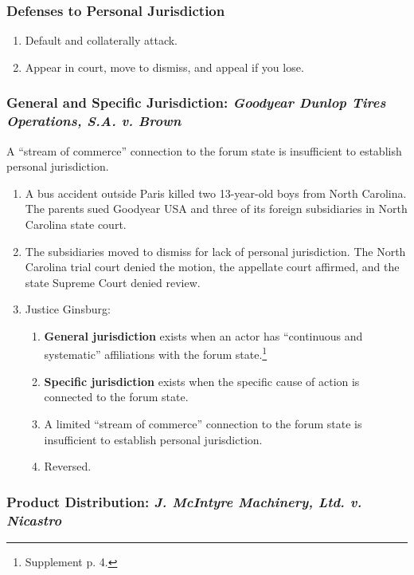 \subsubsection{Defenses to Personal Jurisdiction}

\begin{enumerate}
    \item Default and collaterally attack.
    \item Appear in court, move to dismiss, and appeal if you lose.
\end{enumerate}

\subsubsection{General and Specific Jurisdiction: \emph{Goodyear Dunlop Tires Operations, S.A. v. Brown}}
 
A ``stream of commerce'' connection to the forum state is insufficient to 
establish personal jurisdiction.

\begin{enumerate}
    \item A bus accident outside Paris killed two 13-year-old boys from North 
    Carolina. The parents sued Goodyear USA and three of its foreign 
    subsidiaries in North Carolina state court.
    \item The subsidiaries moved to dismiss for lack of personal jurisdiction. The North Carolina 
    trial court denied the motion, the appellate court affirmed, and the state 
    Supreme Court denied review.
    \item Justice Ginsburg:
    \begin{enumerate}
        \item \textbf{General jurisdiction} exists when an actor has 
        ``continuous and systematic'' affiliations with the forum 
        state.\footnote{Supplement p. 4.}
        \item \textbf{Specific jurisdiction} exists when the specific cause of 
        action is connected to the forum state.
        \item A limited ``stream of commerce'' connection to the forum state 
        is insufficient to establish personal jurisdiction.
        \item Reversed.
    \end{enumerate}
\end{enumerate}

\subsubsection{Product Distribution: \emph{J. McIntyre Machinery, Ltd. v. Nicastro}}

